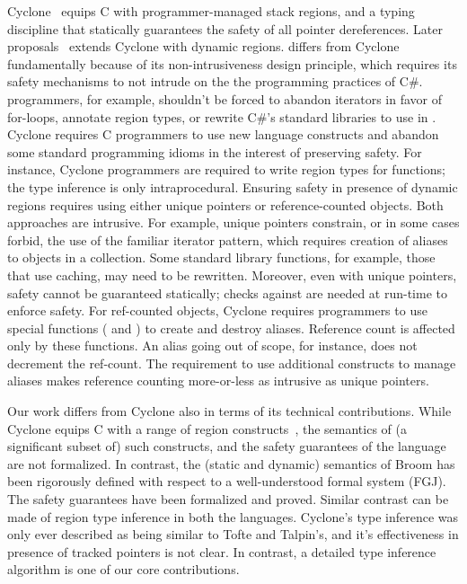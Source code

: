 Cyclone~\cite{cyclone02} equips C with programmer-managed stack
regions, and a typing discipline that statically guarantees the safety
of all pointer dereferences. Later
proposals~\cite{cyclone04,cycloneSCP} extends Cyclone with dynamic
regions. \name differs from Cyclone fundamentally because of its
non-intrusiveness design principle, which requires its safety
mechanisms to not intrude on the the programming practices of C\#.
\name programmers, for example, shouldn’t be forced to abandon
iterators in favor of for-loops, annotate region types, or rewrite
C\#'s standard libraries to use in \name. Cyclone requires C
programmers to use new language constructs and abandon some standard
programming idioms in the interest of preserving safety. For instance,
Cyclone programmers are required to write region types for functions;
the type inference is only intraprocedural. Ensuring safety in
presence of dynamic regions requires using either unique pointers or
reference-counted objects.  Both approaches are intrusive. For
example, unique pointers constrain, or in some cases forbid, the use
of the familiar iterator pattern, which requires creation of aliases
to objects in a collection. Some standard library functions, for
example, those that use caching, may need to be rewritten.  Moreover,
even with unique pointers, safety cannot be guaranteed statically;
checks against  are needed at run-time to enforce safety. For
ref-counted objects, Cyclone requires programmers to use special
functions ( and ) to create and
destroy aliases.  Reference count is affected only by these functions.
An alias going out of scope, for instance, does not decrement the
ref-count. The requirement to use additional constructs
to manage aliases makes reference counting more-or-less as intrusive
as unique pointers.

Our work differs from Cyclone also in terms of its technical
contributions. While Cyclone equips C with a range of region
constructs~\cite{cycloneSCP}, the semantics of (a significant subset
of) such constructs, and the safety guarantees of the language are not
formalized. In contrast, the (static and dynamic) semantics of Broom
has been rigorously defined with respect to a well-understood formal
system (FGJ). The safety guarantees have been formalized and proved.
Similar contrast can be made of region type inference in both the languages.
Cyclone’s type inference was only ever described as being similar to
Tofte and Talpin’s, and it’s effectiveness in presence of tracked
pointers is not clear.
In contrast, a detailed type inference algorithm is one of our core contributions.

